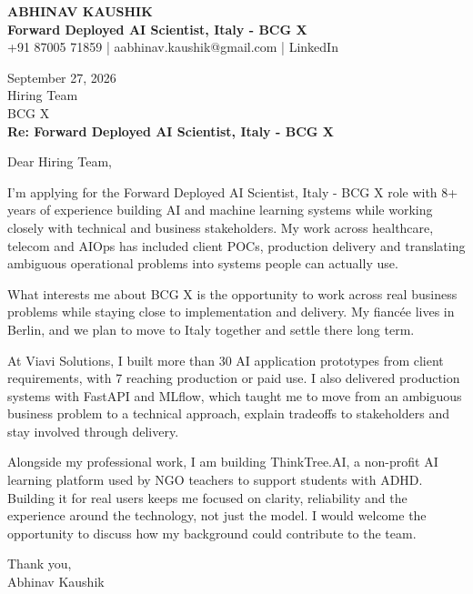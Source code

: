 \documentclass[10pt,a4paper]{article}
\begin{document}
\begin{center}
{\Large\bfseries ABHINAV KAUSHIK}\\[2pt]
{\bfseries Forward Deployed AI Scientist, Italy - BCG X}\\[2pt]
+91 87005 71859 \quad | \quad aabhinav.kaushik@gmail.com \quad | \quad LinkedIn
\end{center}
\vspace{8pt}
September 27, 2026\\[6pt]
Hiring Team\\
BCG X\\[4pt]
\textbf{Re: Forward Deployed AI Scientist, Italy - BCG X}

Dear Hiring Team,

I’m applying for the Forward Deployed AI Scientist, Italy - BCG X role with 8+ years of experience building AI and machine learning systems while working closely with technical and business stakeholders. My work across healthcare, telecom and AIOps has included client POCs, production delivery and translating ambiguous operational problems into systems people can actually use.

What interests me about BCG X is the opportunity to work across real business problems while staying close to implementation and delivery. My fiancée lives in Berlin, and we plan to move to Italy together and settle there long term.

At Viavi Solutions, I built more than 30 AI application prototypes from client requirements, with 7 reaching production or paid use. I also delivered production systems with FastAPI and MLflow, which taught me to move from an ambiguous business problem to a technical approach, explain tradeoffs to stakeholders and stay involved through delivery.

Alongside my professional work, I am building ThinkTree.AI, a non-profit AI learning platform used by NGO teachers to support students with ADHD. Building it for real users keeps me focused on clarity, reliability and the experience around the technology, not just the model. I would welcome the opportunity to discuss how my background could contribute to the team.

Thank you,\\
Abhinav Kaushik
\end{document}
